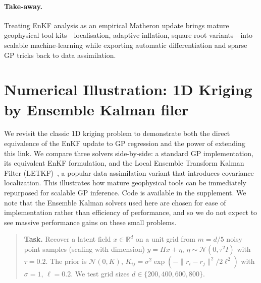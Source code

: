 \documentclass[wcp]{jmlr} %
\begin{document}
\paragraph{Take-away.}
Treating EnKF analysis as an empirical Matheron update brings mature geophysical tool-kits—localisation, adaptive inflation, square-root variants—into scalable machine-learning while exporting automatic differentiation and sparse GP tricks back to data assimilation.

\section{Numerical Illustration:  1D Kriging by Ensemble Kalman filer}
\label{sec:numerical-demo}

We revisit the classic 1D kriging problem to demonstrate both the direct equivalence of the EnKF update to GP regression and the power of extending this link.
We compare three solvers side-by-side: a standard GP implementation, its equivalent EnKF formulation, and the Local Ensemble Transform Kalman Filter (LETKF)~\citep{Bocquet2020Online,Hunt2007Efficient}, a popular data assimilation variant that introduces covariance localization.
This illustrates how mature geophysical tools can be immediately repurposed for scalable GP inference. Code is available in the supplement.
We note that the Ensemble Kalman solvers used here are chosen for ease of implementation rather than efficiency of performance, and so we do not expect to see massive performance gains on these small problems.
\begin{quote}
\textbf{Task.}  Recover a latent field
$x\!\in\!\mathbb R^{d}$ on a unit grid from
$m\!=\!d/5$ noisy point samples (scaling with dimension)
$y = Hx + \eta$, $\eta\!\sim\!\mathcal N(0,\tau^{2}I)$ with
$\tau=0.2$.  The prior is
$\mathcal N(0,K)$, $K_{ij}=\sigma^{2}\!\exp(-\lVert r_i-r_j\rVert^{2}/2\ell^{2})$
with $\sigma=1$, $\ell=0.2$.
We test grid sizes $d\in\{200,400,600,800\}$.
\end{quote}
\end{document}
